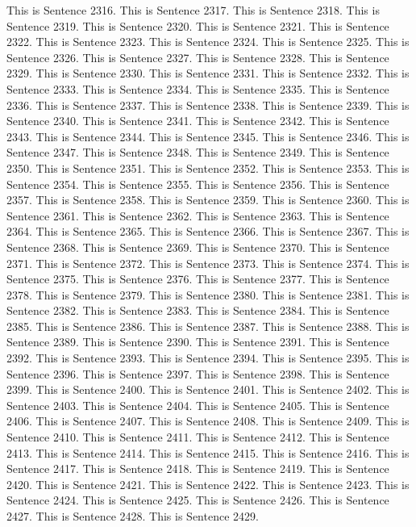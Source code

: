\documentclass{article}
\begin{document}
This is Sentence 2316.
This is Sentence 2317.
This is Sentence 2318.
This is Sentence 2319.
This is Sentence 2320.
This is Sentence 2321.
This is Sentence 2322.
This is Sentence 2323.
This is Sentence 2324.
This is Sentence 2325.
This is Sentence 2326.
This is Sentence 2327.
This is Sentence 2328.
This is Sentence 2329.
This is Sentence 2330.
This is Sentence 2331.
This is Sentence 2332.
This is Sentence 2333.
This is Sentence 2334.
This is Sentence 2335.
This is Sentence 2336.
This is Sentence 2337.
This is Sentence 2338.
This is Sentence 2339.
This is Sentence 2340.
This is Sentence 2341.
This is Sentence 2342.
This is Sentence 2343.
This is Sentence 2344.
This is Sentence 2345.
This is Sentence 2346.
This is Sentence 2347.
This is Sentence 2348.
This is Sentence 2349.
This is Sentence 2350.
This is Sentence 2351.
This is Sentence 2352.
This is Sentence 2353.
This is Sentence 2354.
This is Sentence 2355.
This is Sentence 2356.
This is Sentence 2357.
This is Sentence 2358.
This is Sentence 2359.
This is Sentence 2360.
This is Sentence 2361.
This is Sentence 2362.
This is Sentence 2363.
This is Sentence 2364.
This is Sentence 2365.
This is Sentence 2366.
This is Sentence 2367.
This is Sentence 2368.
This is Sentence 2369.
This is Sentence 2370.
This is Sentence 2371.
This is Sentence 2372.
This is Sentence 2373.
This is Sentence 2374.
This is Sentence 2375.
This is Sentence 2376.
This is Sentence 2377.
This is Sentence 2378.
This is Sentence 2379.
This is Sentence 2380.
This is Sentence 2381.
This is Sentence 2382.
This is Sentence 2383.
This is Sentence 2384.
This is Sentence 2385.
This is Sentence 2386.
This is Sentence 2387.
This is Sentence 2388.
This is Sentence 2389.
This is Sentence 2390.
This is Sentence 2391.
This is Sentence 2392.
This is Sentence 2393.
This is Sentence 2394.
This is Sentence 2395.
This is Sentence 2396.
This is Sentence 2397.
This is Sentence 2398.
This is Sentence 2399.
This is Sentence 2400.
This is Sentence 2401.
This is Sentence 2402.
This is Sentence 2403.
This is Sentence 2404.
This is Sentence 2405.
This is Sentence 2406.
This is Sentence 2407.
This is Sentence 2408.
This is Sentence 2409.
This is Sentence 2410.
This is Sentence 2411.
This is Sentence 2412.
This is Sentence 2413.
This is Sentence 2414.
This is Sentence 2415.
This is Sentence 2416.
This is Sentence 2417.
This is Sentence 2418.
This is Sentence 2419.
This is Sentence 2420.
This is Sentence 2421.
This is Sentence 2422.
This is Sentence 2423.
This is Sentence 2424.
This is Sentence 2425.
This is Sentence 2426.
This is Sentence 2427.
This is Sentence 2428.
This is Sentence 2429.
\end{document}
